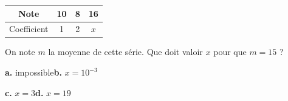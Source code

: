 \begin{center}
\begin{tabular}{|c|c|c|c|}
\hline
Note & 10 & 8 & 16 \\
\hline
Coefficient & 1 & 2 & $x$ \\
\hline
\end{tabular}
\end{center}

On note $m$ la moyenne de cette série. Que doit valoir $x$ pour que $m = 15$ ?

\textbf{a.} impossible\hfill \textbf{b.} $x = 10^{-3}$

\textbf{c.} $x = 3$\hfill \textbf{d.} $x = 19$



